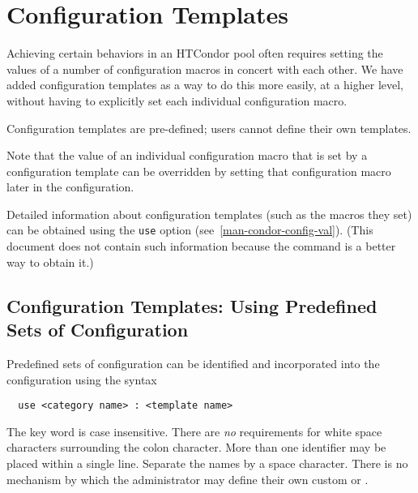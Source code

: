\section{Configuration Templates}\label{sec:Configuring-HTCondor-Templates}


Achieving certain behaviors in an HTCondor pool often requires
setting the values of a number of configuration macros in concert
with each other.  We have added configuration templates as a way
to do this more easily, at a higher level, without having to
explicitly set each individual configuration macro.

Configuration templates are pre-defined; users cannot define their
own templates.

Note that the value of an individual configuration macro that is
set by a configuration template can be overridden by setting that
configuration macro later in the configuration.

Detailed information about configuration templates (such as the
macros they set) can be obtained using the 
\texttt{use} option (see~\ref{man-condor-config-val}).
(This document does not contain such information because the
 command is a better way to obtain it.)

\subsection{\label{sec:Config-Templates}Configuration Templates: Using
Predefined Sets of Configuration}
Predefined sets of configuration can be identified and incorporated
into the configuration using the syntax
\begin{verbatim}
  use <category name> : <template name> 
\end{verbatim}

The  key word is case insensitive.
There are \emph{no} requirements for white space characters surrounding
the colon character.
More than one  identifier may be placed within
a single  line. 
Separate the names by a space character. 
There is no mechanism by which the administrator may define their
own custom  or .

